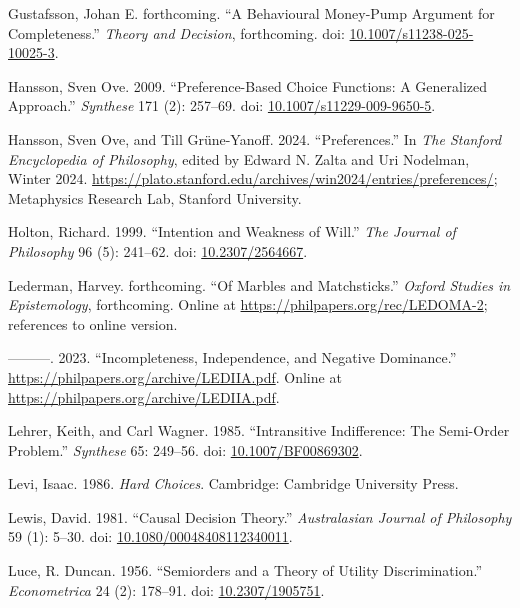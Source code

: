 \documentclass[
  11pt,
  letterpaper,
  DIV=11,
  numbers=noendperiod,
  twoside]{scrartcl}
\newlength{\cslhangindent}
\newenvironment{CSLReferences}[2] %
 {\begin{list}{}{%
  \setlength{\itemindent}{0pt}
  \setlength{\leftmargin}{0pt}
  \setlength{\parsep}{0pt}
  \ifodd #1
   \setlength{\leftmargin}{\cslhangindent}
   \setlength{\itemindent}{-1\cslhangindent}
  \fi
  \setlength{\itemsep}{#2\baselineskip}}}
 {\end{list}}
\begin{document}
\begin{CSLReferences}{1}{0}
Gustafsson, Johan E. forthcoming. {``A Behavioural Money-Pump Argument
for Completeness.''} \emph{Theory and Decision}, forthcoming. doi:
\href{https://doi.org/10.1007/s11238-025-10025-3}{10.1007/s11238-025-10025-3}.

Hansson, Sven Ove. 2009. {``Preference-Based Choice Functions: A
Generalized Approach.''} \emph{Synthese} 171 (2): 257--69. doi:
\href{https://doi.org/10.1007/s11229-009-9650-5}{10.1007/s11229-009-9650-5}.

Hansson, Sven Ove, and Till Grüne-Yanoff. 2024. {``{Preferences}.''} In
\emph{The {Stanford} Encyclopedia of Philosophy}, edited by Edward N.
Zalta and Uri Nodelman, {W}inter 2024.
\url{https://plato.stanford.edu/archives/win2024/entries/preferences/};
Metaphysics Research Lab, Stanford University.

Holton, Richard. 1999. {``Intention and Weakness of Will.''} \emph{The
Journal of Philosophy} 96 (5): 241--62. doi:
\href{https://doi.org/10.2307/2564667}{10.2307/2564667}.

Lederman, Harvey. forthcoming. {``Of Marbles and Matchsticks.''}
\emph{Oxford Studies in Epistemology}, forthcoming. Online at
\url{https://philpapers.org/rec/LEDOMA-2}; references to online version.

---------. 2023. {``Incompleteness, Independence, and Negative
Dominance.''} \url{https://philpapers.org/archive/LEDIIA.pdf}. Online at
\url{https://philpapers.org/archive/LEDIIA.pdf}.

Lehrer, Keith, and Carl Wagner. 1985. {``Intransitive Indifference: The
Semi-Order Problem.''} \emph{Synthese} 65: 249--56. doi:
\href{https://doi.org/10.1007/BF00869302}{10.1007/BF00869302}.

Levi, Isaac. 1986. \emph{Hard Choices}. Cambridge: Cambridge University
Press.

Lewis, David. 1981. {``Causal Decision Theory.''} \emph{Australasian
Journal of Philosophy} 59 (1): 5--30. doi:
\href{https://doi.org/10.1080/00048408112340011}{10.1080/00048408112340011}.

Luce, R. Duncan. 1956. {``Semiorders and a Theory of Utility
Discrimination.''} \emph{Econometrica} 24 (2): 178--91. doi:
\href{https://doi.org/10.2307/1905751}{10.2307/1905751}.


\end{CSLReferences}
\end{document}
